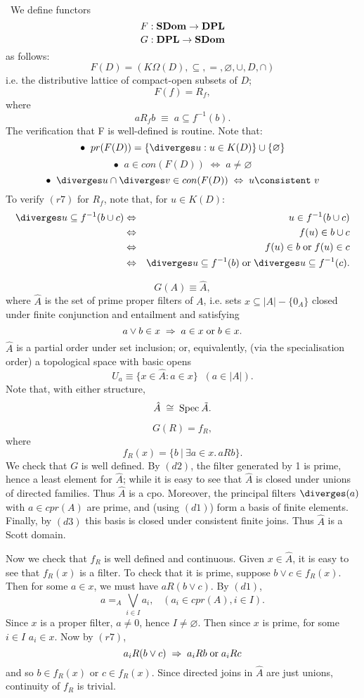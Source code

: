 \proof\ We define functors
\[ F : {\bf SDom} \rightarrow {\bf DPL} \]
\[ G : {\bf DPL} \rightarrow {\bf SDom} \]
as follows:
\[ F(D) = (K \Omega (D), \subseteq , =, \varnothing , \cup , D, \cap ) \]
i.e. the distributive lattice of compact-open subsets of $D$;
\[ F(f) = R_{f}, \]
where
\[ a R_{f} b \; \equiv \; a \subseteq f^{- 1}(b). \]
The verification that F is well-defined is routine. Note that:
\[ \bullet \;\; pr(F(D)) = \{\diverges  u : u \in K(D) \} \cup \{\varnothing \} \]
\[ \bullet \;\; a \in con(F(D)) \; \Leftrightarrow \; a \not= \varnothing \]
\[ \bullet \;\; {\diverges  u} \cap {\diverges  v} \in con(F(D)) \; \Leftrightarrow \; u \consistent\ v \]
To verify $(r7)$ for $R_{f}$, note that, for $u \in K(D)$:
\begin{eqnarray*}
\diverges  u \subseteq f^{-1}(b \cup c)  & \Leftrightarrow &  u \in f^{-1}(b \cup c) \\
                     & \Leftrightarrow & f(u) \in b \cup c \\
                     & \Leftrightarrow & f(u) \in b \; {\rm or} \; f(u) \in c \\
                     & \Leftrightarrow & \diverges  u \subseteq  f^{-1}(b) 
\; {\rm or} \; \diverges  u \subseteq f^{-1}(c). 
\end{eqnarray*} 

\[ G(A) \equiv \hat{A}, \]
where $\hat{A}$ is the set of prime proper filters of $A$, i.e. sets $x \subseteq |A| - \{0_{A}\}$ closed under finite conjunction and entailment and satisfying
\[ a \vee b \in x \; \Rightarrow \; a \in x \; {\rm or} \; b \in x. \]
$\hat{A}$ is a partial order under set inclusion; or, equivalently, (via the specialisation order) a topological space with basic opens
\[ U_{a} \equiv \{x \in \hat{A} : a \in x \} \;\; (a \in |A|). \]
Note that, with either structure,
\[ \hat{A} \; \cong \; {\rm Spec} \: \tilde{A}. \]

\[ G(R) = f_{R}, \]
where
\[ f_{R}(x) = \{b \: | \: \exists a \in x. \, a R b \}. \]
We check that $G$ is well defined. By $(d2)$, the filter generated by 1
is prime, hence a least element for $\hat{A}$; while it is easy to see that $\hat{A}$ is closed under unions of directed families. 
Thus $\hat{A}$ is a cpo. 
Moreover, the principal filters $\diverges  (a)$ with $a \in cpr(A)$ are prime, and (using $(d1)$) form a basis of finite elements.
Finally, by $(d3)$ this basis is closed under consistent finite  joins. Thus $\hat{A}$ is a Scott domain.

Now we check that $f_{R}$ is well defined and continuous. Given $x \in \hat{A}$, it is easy to see that $f_{R}(x)$ is a filter. To check that it is prime, suppose $b \vee c \in f_{R}(x)$. 
Then for some $a \in x$, we must have $a R (b \vee c)$. 
By $(d1)$,
\[ a =_{A} \bigvee_{i \in I}a_{i}, \;\;\;(a_{i} \in cpr(A), i \in I). \]
Since $x$ is a proper filter, $a \not= 0$, hence $I \not= \varnothing$. 
Then since $x$ is prime, for some $i \in I$ $a_{i} \in x$. Now by $(r7)$,
\[ a_{i} R (b \vee c) \; \Rightarrow \; a_{i} R b \; {\rm or} \; a_{i} R c \]
and so $b \in f_{R}(x)$ or $c \in f_{R}(x)$.
Since directed joins in $\hat{A}$ are just unions, continuity of $f_{R}$ is trivial.

